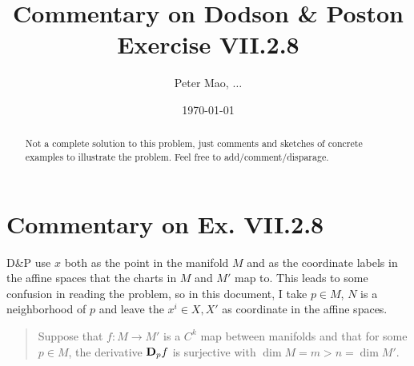 \documentclass[11pt]{article}
\title{Commentary on Dodson \& Poston Exercise VII.2.8}
\author{Peter Mao, $\ldots$}
\date{\today}
\begin{document}
\maketitle
\pagestyle{empty}

\begin{abstract}
  Not a complete solution to this problem, just comments and sketches of concrete
  examples to illustrate the problem.  Feel free to add/comment/disparage.
\end{abstract}

\section{Commentary on Ex. VII.2.8}
D\&P use $x$ both as the point in the manifold $M$ and as the coordinate labels
in the affine spaces that the charts in $M$ and $M'$ map to.  This leads to some
confusion in reading the problem, so in this document, I take $p \in M$, $N$ is
a neighborhood of $p$ and leave the $x^i \in X, X'$ as coordinate in the affine
spaces.

\begin{quote}
  Suppose that $f \colon M \rightarrow M'$ is a $C^k$ map between manifolds and
  that for some $p \in M$, the derivative ${\bf D}_pf$ is surjective with $\dim
  M = m > n = \dim M'$.
\end{quote}
\end{document}
